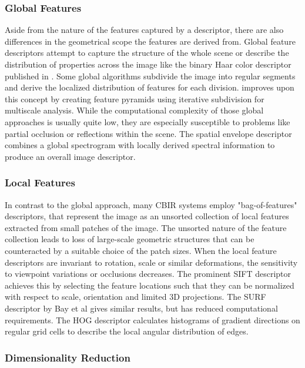 \subsubsection{Global Features}

Aside from the nature of the features captured by a descriptor, there are also
differences in the geometrical scope the features are derived from. Global
feature descriptors attempt to capture the structure of the whole scene or
describe the distribution of properties across the image like the binary Haar
color descriptor published in \autocite{utenpattanant_color_2006}. Some global
algorithms subdivide the image into regular segments and derive the localized
distribution of features for each division. \autocite{lazebnik_beyond_2006}
improves upon this concept by creating feature pyramids using iterative
subdivision for multiscale analysis. While the computational complexity of
those global approaches is usually quite low, they are especially susceptible
to problems like partial occlusion or reflections within the scene. The spatial
envelope descriptor \autocite{oliva_modeling_2001} combines a global
spectrogram with locally derived spectral information to produce an overall
image descriptor.

\subsubsection{Local Features}

In contrast to the global approach, many CBIR systems employ "bag-of-features"
descriptors, that represent the image as an unsorted collection of local
features extracted from small patches of the image. The unsorted nature of the
feature collection leads to loss of large-scale geometric structures that can
be counteracted by a suitable choice of the patch sizes. When the local feature
descriptors are invariant to rotation, scale or similar deformations, the
sensitivity to viewpoint variations or occlusions decreases. The prominent SIFT
descriptor \autocite{lowe_object_1999} achieves this by selecting the feature
locations such that they can be normalized with respect to scale, orientation
and limited 3D projections. The SURF descriptor by Bay et al
\autocite{bay_speeded-up_2008} gives similar results, but has reduced
computational requirements. The HOG descriptor \autocite{dalal_histograms_2005}
calculates histograms of gradient directions on regular grid cells to describe
the local angular distribution of edges.

\subsubsection{Dimensionality Reduction}

